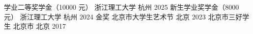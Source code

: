 
\begin{cvhonors}
  \cvhonor
    {学业二等奖学金（10000 元）}
    {浙江理工大学}
    {杭州}
    {2025}
  \cvhonor
    {新生学业奖学金（8000 元）}
    {浙江理工大学}
    {杭州}
    {2024}
  \cvhonor
    {金奖}
    {北京市大学生艺术节}
    {北京}
    {2023}
  \cvhonor
    {北京市三好学生}
    {北京市}
    {北京}
    {2017}
\end{cvhonors}
